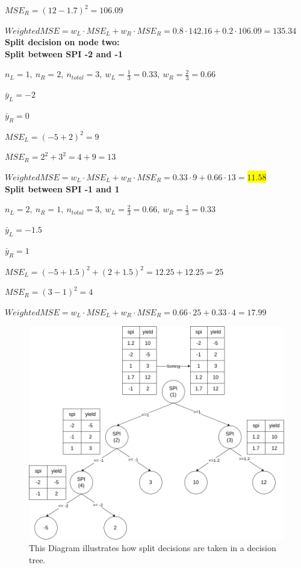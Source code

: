 \documentclass{article}
\begin{document}
$MSE_R = (12 - 1.7)^2 = 106.09$

$Weighted MSE = w_L \cdot MSE_L + w_R \cdot MSE_R = 0.8 \cdot 142.16 + 0.2 \cdot 106.09 = 135.34$
\\
\textbf{Split decision on node two:}
\\
\textbf{Split between SPI -2 and -1}

$n_L = 1, \ n_R = 2, \ n_{total} = 3, \ w_L = \frac{1}{3} = 0.33, \ w_R = \frac{2}{3} = 0.66$

$\bar{y}_L = -2$

$\bar{y}_R = 0$

$MSE_L = (-5 + 2)^2 = 9$

$MSE_R = 2^2 + 3^2 = 4 + 9 = 13$

$Weighted MSE = w_L \cdot MSE_L + w_R \cdot MSE_R = 0.33 \cdot 9 + 0.66 \cdot 13 =$\colorbox{yellow}{$11.58$}
\noindent
\\
\textbf{Split between SPI -1 and 1 }

$n_L = 2, \ n_R = 1, \ n_{total} = 3, \ w_L = \frac{2}{3} = 0.66, \ w_R = \frac{1}{3} = 0.33$

$\bar{y}_L = -1.5$

$\bar{y}_R = 1$

$MSE_L = (-5 + 1.5)^2 + (2 + 1.5)^2 = 12.25 + 12.25 = 25$

$MSE_R = (3 - 1)^2 = 4$

$Weighted MSE = w_L \cdot MSE_L + w_R \cdot MSE_R = 0.66 \cdot 25 + 0.33 \cdot 4 = 17.99$

\begin{figure}[H]
	\centering
	\includegraphics[width=1.0\textwidth]{./plots/DecisionTreeSplit.png}
	\caption{\label{fig:decision_tree_split}This Diagram illustrates how split decisions are taken in a decision tree.}
\end{figure}
\noindent
\end{document}
